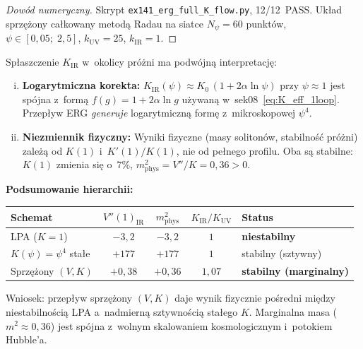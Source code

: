 \begin{proof}[Dow\'od numeryczny]
Skrypt \texttt{ex141\_erg\_full\_K\_flow.py}, 12/12~PASS.
Uk\l{}ad sprz\k{e}\.zony ca\l{}kowany metod\k{a} Radau
na siatce $N_\psi = 60$ punkt\'ow,
$\psi \in [0{,}05;\; 2{,}5]$,
$k_{\mathrm{UV}} = 25$, $k_{\mathrm{IR}} = 1$.
\end{proof}

\begin{remark}%
\label{rem:M-shape-deformation}
Sp\l{}aszczenie $K_{\mathrm{IR}}$ w~okolicy pr\'o\.zni ma
podw\'ojn\k{a} interpretacj\k{e}:

\begin{enumerate}[(i)]
\item \textbf{Logarytmiczna korekta:}
  $K_{\mathrm{IR}}(\psi) \approx K_0\,(1 + 2\alpha\ln\psi)$
  przy $\psi \approx 1$ jest sp\'ojna z~form\k{a}
  $f(g) = 1 + 2\alpha\ln g$ u\.zywan\k{a}
  w~sek08~\eqref{eq:K_eff_1loop}.
  Przep\l{}yw ERG \emph{generuje} logarytmiczn\k{a}
  form\k{e} z~mikroskopowej $\psi^4$.

\item \textbf{Niezmiennik fizyczny:}
  Wyniki fizyczne (masy soliton\'ow, stabilno\'s\'c pr\'o\.zni)
  zale\.z\k{a} od $K(1)$ i~$K'(1)/K(1)$,
  nie od pe\l{}nego profilu.
  Oba s\k{a} stabilne: $K(1)$ zmienia si\k{e} o~$7\%$,
  $m^2_{\mathrm{phys}} = V''/K = 0{,}36 > 0$.
\end{enumerate}

\noindent
\textbf{Podsumowanie hierarchii:}
\begin{center}
\begin{tabular}{@{}lcccl@{}}
\toprule
Schemat & $V''(1)_{\mathrm{IR}}$ & $m^2_{\mathrm{phys}}$
        & $K_{\mathrm{IR}}/K_{\mathrm{UV}}$ & Status \\
\midrule
LPA ($K=1$)
  & $-3{,}2$ & $-3{,}2$ & $1$ & \textbf{niestabilny} \\
$K(\psi)=\psi^4$ sta\l{}e
  & $+177$ & $+177$ & $1$ & stabilny (sztywny) \\
Sprz\k{e}\.zony $(V,K)$
  & $+0{,}38$ & $+0{,}36$ & $1{,}07$ & \textbf{stabilny (marginalny)} \\
\bottomrule
\end{tabular}
\end{center}

\noindent
Wniosek: przep\l{}yw sprz\k{e}\.zony $(V,K)$ daje wynik
fizycznie po\'sredni mi\k{e}dzy niestabilno\'sci\k{a} LPA
a~nadmiern\k{a} sztywno\'sci\k{a} sta\l{}ego $K$.
Marginalna masa ($m^2 \approx 0{,}36$) jest sp\'ojna
z~wolnym skalowaniem kosmologicznym i~potokiem Hubble'a.
\end{remark}

